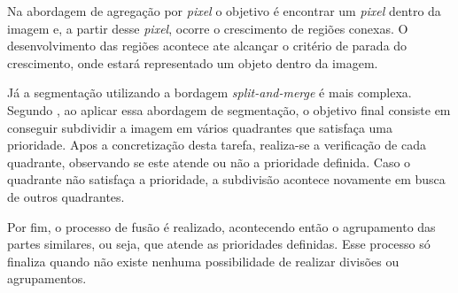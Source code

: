 Na abordagem de agregação por \textit{pixel} o objetivo é encontrar um \textit{pixel} dentro da imagem e, a partir desse \textit{pixel}, ocorre o crescimento de regiões conexas. O desenvolvimento das regiões acontece ate alcançar o critério de parada do crescimento, onde estará representado um objeto dentro da imagem.

Já a segmentação utilizando a bordagem \textit{split-and-merge} é mais complexa. Segundo , ao aplicar essa abordagem de segmentação, o objetivo final consiste em conseguir subdividir a imagem em vários quadrantes que satisfaça uma prioridade. Apos a concretização desta tarefa, realiza-se a verificação de cada quadrante, observando se este atende ou não a prioridade definida. Caso o quadrante não satisfaça a prioridade, a subdivisão acontece novamente em busca de outros quadrantes.

Por fim, o processo de fusão é realizado, acontecendo então o agrupamento das partes similares, ou seja, que atende as prioridades definidas. Esse processo só finaliza quando não existe nenhuma possibilidade de realizar divisões ou agrupamentos.